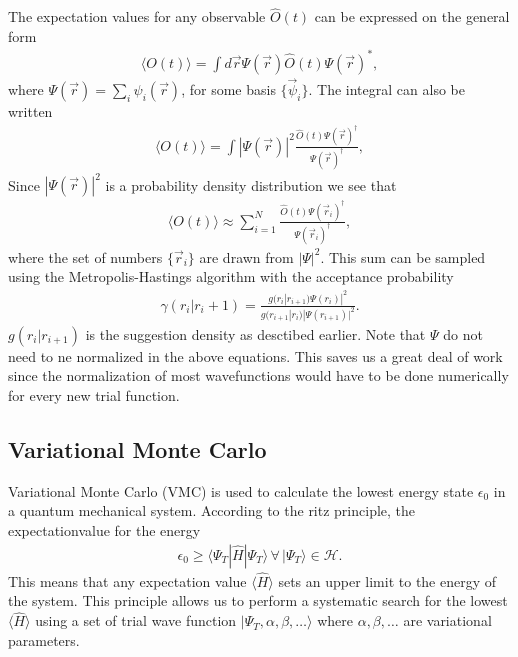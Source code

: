 \documentclass[a4paper,10pt,twocolumn]{article} %
\newcommand{\bra}[1]{\langle{#1}|}
\newcommand{\ket}[1]{|#1\rangle{}}
\newcommand{\expec}[1]{\langle{}{#1}\rangle{}}
\begin{document}
The expectation values for any observable $\hat O(t)$ can be expressed on the general form
\begin{align}
	\expec{ O(t) } = \int d\vec r \Psi(\vec r) \hat O(t) \Psi(\vec r)^*,\label{exv}
\end{align}
where $\Psi(\vec r) = \sum_i \psi_i(\vec r)$, for some basis $\{ \vec \psi_i \}$. 
The integral can also be written 
\begin{align}
	\expec{ O(t) } = \int |\Psi(\vec r)|^2 \frac{ \hat O(t) \Psi(\vec r)^\dagger } {\Psi(\vec r)^\dagger},
\end{align}
Since $|\Psi(\vec r)|^2$ is a probability density distribution we see that
\begin{align}
	\expec{ O(t) } \approx \sum_{i=1}^N \frac{ \hat O(t) \Psi(\vec r_i)^\dagger } {\Psi(\vec r_i)^\dagger}, \label{RFQMC1} 
\end{align}
%
where the set of numbers $\{\vec r_i\}$ are drawn from $|\Psi|^2$.
This sum can be sampled using the Metropolis-Hastings algorithm with the acceptance probability 
\begin{align}
	\gamma(r_i|r_i+1)=\frac
		{g(r_i|r_{i+1})\Psi(r_i)|^2}
		{g(r_{i+1}|r_i)|\Psi(r_{i+1})|^2}.
\end{align} 
$g(r_i|r_{i+1})$ is the suggestion density as desctibed earlier.
%
Note that $\Psi$ do not need to ne normalized in the above equations. This saves us a great deal of work since the normalization 
of most wavefunctions would have to be done numerically for every new trial function.%


\subsection{Variational Monte Carlo}%

Variational Monte Carlo (VMC) is used to calculate the lowest energy state $\epsilon_0$ in a quantum mechanical system.
According to the ritz principle, the expectationvalue for the energy 
\begin{align}
	\epsilon_0\ge\bra{\Psi_T} \hat H \ket{\Psi_T}\,\forall\,\ket{\Psi_T}\in\mathcal H.
\end{align} 
%
This means that any expectation value $\expec{\hat H}$ sets an upper limit to the energy of the system. 
%
This principle allows us to perform a systematic search for the lowest $\expec{\hat H}$ using a set of trial wave function 
$\ket{\Psi_T,\alpha,\beta,\dots}$ where $\alpha,\beta,\dots$ are variational parameters. %
\end{document}
